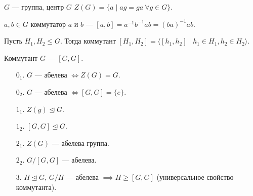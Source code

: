 \begin{definition}
    $G$ --- группа, центр  $G$  $Z(G) = \{ a \mid ag = ga\ \forall g \in G\}$.
\end{definition}
\begin{definition}
    $a, b \in G$ коммутатор  $a$ и  $b$ ---  $[a, b] = a^{-1}b^{-1}ab = (ba)^{-1}ab$.
\end{definition}
\begin{definition}
    Пусть $H_1, H_2 \le G$. Тогда коммутант $[H_1, H_2] = \langle [h_1, h_2] \mid h_1 \in H_1, h_2 \in H_2\rangle$.
\end{definition}
\begin{definition}
    Коммутант $G$ --- $[G, G]$.
\end{definition}
\begin{theorem}
    \begin{enumerate}
        \item[$0_1$.] $G$ --- абелева  $\iff Z(G) = G$.
        \item[$0_2$.] $G$ --- абелева $\iff [G, G] = \{e\}$.
        \item[$1_1$.] $Z(g) \trianglelefteq G$.
        \item[$1_2$.] $[G, G] \trianglelefteq G$.
        \item[$2_1$.] $Z(G)$ --- абелева группа.
        \item[$2_2$.] $G / [G, G]$ --- абелева.
        \item[3.]  $H \trianglelefteq G$,  $G / H$ --- абелева  $\implies H \ge [G, G]$ (универсальное свойство коммутанта).
    \end{enumerate}
\end{theorem}
